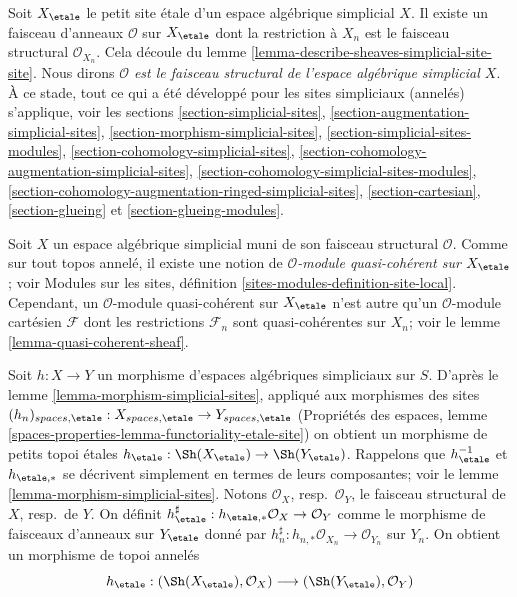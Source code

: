 \medskip\noindent
Soit $X_\etale$ le petit site \'etale d'un espace algébrique simplicial $X$.
Il existe un faisceau d'anneaux $\mathcal{O}$ sur $X_\etale$ dont la restriction
à $X_n$ est le faisceau structural $\mathcal{O}_{X_n}$. Cela découle du lemme
\ref{lemma-describe-sheaves-simplicial-site-site}. Nous dirons
{\it $\mathcal{O}$ est le faisceau structural de l'espace algébrique simplicial
$X$}.
À ce stade, tout ce qui a été développé pour les sites simpliciaux (annelés)
s'applique, voir les sections \ref{section-simplicial-sites},
\ref{section-augmentation-simplicial-sites},
\ref{section-morphism-simplicial-sites},
\ref{section-simplicial-sites-modules},
\ref{section-cohomology-simplicial-sites},
\ref{section-cohomology-augmentation-simplicial-sites},
\ref{section-cohomology-simplicial-sites-modules},
\ref{section-cohomology-augmentation-ringed-simplicial-sites},
\ref{section-cartesian},
\ref{section-glueing} et
\ref{section-glueing-modules}.

\medskip\noindent
Soit $X$ un espace algébrique simplicial muni de son faisceau structural $\mathcal{O}$.
Comme sur tout topos annelé, il existe une notion
de {\it $\mathcal{O}$-module quasi-cohérent sur $X_\etale$}; voir Modules
sur les sites, définition \ref{sites-modules-definition-site-local}.
Cependant, un $\mathcal{O}$-module quasi-cohérent sur $X_\etale$ n'est
autre qu'un $\mathcal{O}$-module cartésien $\mathcal{F}$ dont les restrictions
$\mathcal{F}_n$ sont quasi-cohérentes sur $X_n$; voir le lemme
\ref{lemma-quasi-coherent-sheaf}.

\medskip\noindent
Soit $h : X \to Y$ un morphisme d'espaces algébriques simpliciaux sur $S$.
D'après le lemme \ref{lemma-morphism-simplicial-sites}, appliqué aux morphismes
des sites $(h_n)_{spaces, \etale} : X_{spaces, \etale} \to Y_{spaces, \etale}$
(Propriétés des espaces, lemme
\ref{spaces-properties-lemma-functoriality-etale-site})
on obtient un morphisme de petits topoi étales
$h_\etale : \Sh(X_\etale) \to \Sh(Y_\etale)$.
Rappelons que $h_\etale^{-1}$ et $h_{\etale, *}$ se décrivent simplement
en termes de leurs composantes; voir le
lemme \ref{lemma-morphism-simplicial-sites}.
Notons $\mathcal{O}_X$, resp.\ $\mathcal{O}_Y$, le faisceau structural
de $X$, resp.\ de $Y$. On définit
$h_\etale^\sharp : h_{\etale, *}\mathcal{O}_X \to \mathcal{O}_Y$
comme le morphisme de faisceaux d'anneaux sur $Y_\etale$ donné par
$h_n^\sharp : h_{n, *}\mathcal{O}_{X_n} \to \mathcal{O}_{Y_n}$ sur $Y_n$.
On obtient un morphisme de topoi annelés
$$
h_\etale :
(\Sh(X_\etale), \mathcal{O}_X)
\longrightarrow
(\Sh(Y_\etale), \mathcal{O}_Y)
$$

